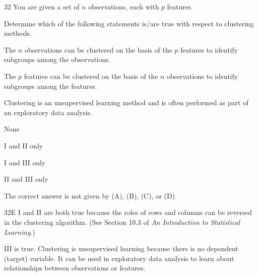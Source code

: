\begin{question}{32}
You are given a set of $n$ observations, each with $p$ features.

Determine which of the following statements is/are true with respect to clustering methods.
\begin{statements}
\item The $n$ observations can be clustered on the basis of the $p$ features to identify subgroups among the observations.
\item The $p$ features can be clustered on the basis of the $n$ observations to identify subgroups among the features.
\item Clustering is an unsupervised learning method and is often performed as part of an exploratory data analysis.
\end{statements}

\begin{choices}
\item None
\item I and II only
\item I and III only
\item II and III only
\item The correct answer is not given by (A), (B), (C), or (D).
\end{choices}
\end{question}
\begin{solution}{32}{E}
I and II are both true because the roles of rows and columns can be reversed in the clustering algorithm. (See Section 10.3 of \textit{An Introduction to Statistical Learning}.)

III is true. Clustering is unsupervised learning because there is no dependent (target) variable. It can be used in exploratory data analysis to learn about relationships between observations or features.
\end{solution}

